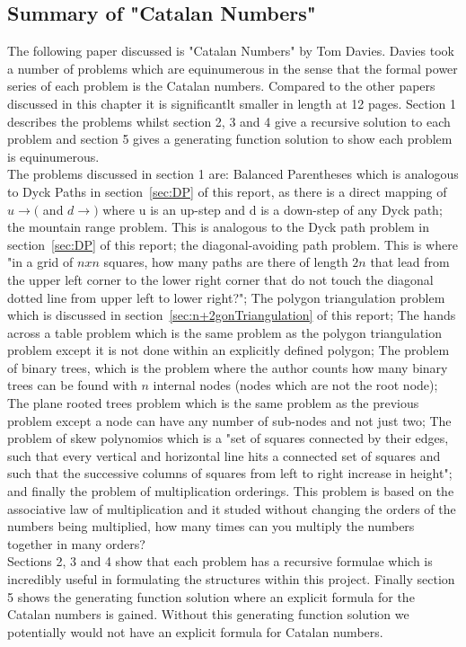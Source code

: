 \documentclass[12pt]{article}
\begin{document}
\subsection{Summary of "Catalan Numbers"}
The following paper discussed is "Catalan Numbers" by Tom Davies. \cite{CataNumDavies} Davies took a number of problems which are equinumerous in the sense that the formal power series of each problem is the Catalan numbers. Compared to the other papers discussed in this chapter it is significantlt smaller in length at 12 pages. Section 1 describes the problems whilst section 2, 3 and 4 give a recursive solution to each problem and section 5 gives a generating function solution to show each problem is equinumerous.\\
The problems discussed in section 1 are: Balanced Parentheses which is analogous to Dyck Paths in section~\ref{sec:DP} of this report, as there is a direct mapping of $u \rightarrow ($ and $d \rightarrow )$ where u is an up-step and d is a down-step of any Dyck path; the mountain range problem. This is analogous to the Dyck path problem in section~\ref{sec:DP} of this report; the diagonal-avoiding path problem. This is where "in a grid of $nxn$ squares, how many paths are there of length $2n$ that lead from the upper left corner to the lower right corner that do not touch the diagonal dotted line from upper left to lower right?"; The polygon triangulation problem which is discussed in section~\ref{sec:n+2gonTriangulation} of this report; The hands across a table problem which is the same problem as the polygon triangulation problem except it is not done within an explicitly defined polygon; The problem of binary trees, which is the problem where the author counts how many binary trees can be found with $n$ internal nodes (nodes which are not the root node); The plane rooted trees problem which is the same problem as the previous problem except a node can have any number of sub-nodes and not just two; The problem of skew polynomios which is a "set of squares connected by their edges, such that every vertical and horizontal line hits a connected set of squares and such that the successive columns of squares from left to right increase in height"; and finally the problem of multiplication orderings. This problem is based on the associative law of multiplication and it studed without changing the orders of the numbers being multiplied, how many times can you multiply the numbers together in many orders?\\
Sections 2, 3 and 4 show that each problem has a recursive formulae which is incredibly useful in formulating the structures within this project. Finally section 5 shows the generating function solution where an explicit formula for the Catalan numbers is gained. Without this generating function solution we potentially would not have an explicit formula for Catalan numbers.
\end{document}
